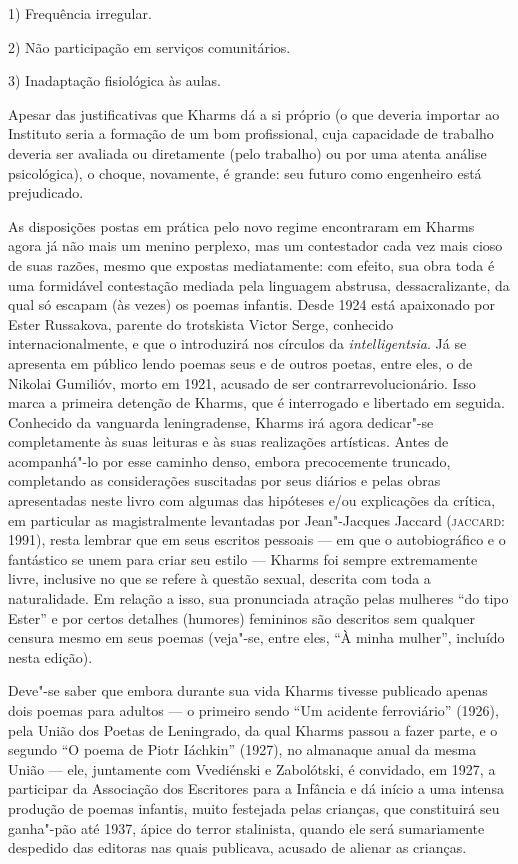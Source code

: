 1) Frequência irregular.

2) Não participação em serviços comunitários.

3) Inadaptação fisiológica às aulas.

Apesar das justificativas que Kharms dá a si próprio (o que deveria
importar ao Instituto seria a formação de um bom profissional, cuja
capacidade de trabalho deveria ser avaliada ou diretamente (pelo
trabalho) ou por uma atenta análise psicológica), o choque, novamente, é
grande: seu futuro como engenheiro está prejudicado.

As disposições postas em prática pelo novo regime encontraram em Kharms
agora já não mais um menino perplexo, mas um contestador cada vez mais
cioso de suas razões, mesmo que expostas mediatamente: com efeito, sua
obra toda é uma formidável contestação mediada pela linguagem abstrusa,
dessacralizante, da qual só escapam (às vezes) os poemas infantis. Desde
1924 está apaixonado por Ester Russakova, parente do trotskista Victor
Serge, conhecido internacionalmente, e que o introduzirá nos círculos da
\emph{intelligentsia}. Já se apresenta em público lendo poemas seus e de
outros poetas, entre eles, o de Nikolai Gumilióv, morto em 1921, acusado
de ser contrarrevolucionário. Isso marca a primeira detenção de Kharms,
que é interrogado e libertado em seguida. Conhecido da vanguarda
leningradense, Kharms irá agora dedicar"-se completamente às suas
leituras e às suas realizações artísticas. Antes de acompanhá"-lo por
esse caminho denso, embora precocemente truncado, completando as
considerações suscitadas por seus diários e pelas obras apresentadas
neste livro com algumas das hipóteses e/ou explicações da crítica, em
particular as magistralmente levantadas por Jean"-Jacques Jaccard
(\textsc{jaccard}: 1991), resta lembrar que em seus escritos pessoais ---
em que o autobiográfico e o fantástico se unem para criar seu estilo ---
Kharms foi sempre extremamente livre, inclusive no que se refere à
questão sexual, descrita com toda a naturalidade. Em relação a isso, sua
pronunciada atração pelas mulheres ``do tipo Ester'' e por certos
detalhes (humores) femininos são descritos sem qualquer censura mesmo em
seus poemas (veja"-se, entre eles, ``À minha mulher'', incluído nesta
edição).

Deve"-se saber que embora durante sua vida Kharms tivesse publicado
apenas dois poemas para adultos --- o primeiro sendo ``Um acidente
ferroviário'' (1926), pela União dos Poetas de Leningrado, da qual
Kharms passou a fazer parte, e o segundo ``O poema de Piotr Iáchkin''
(1927), no almanaque anual da mesma União --- ele, juntamente com
Vvediénski e Zabolótski, é convidado, em 1927, a participar da
Associação dos Escritores para a Infância e dá início a uma intensa
produção de poemas infantis, muito festejada pelas crianças, que
constituirá seu ganha"-pão até 1937, ápice do terror stalinista, quando
ele será sumariamente despedido das editoras nas quais publicava,
acusado de alienar as crianças.

